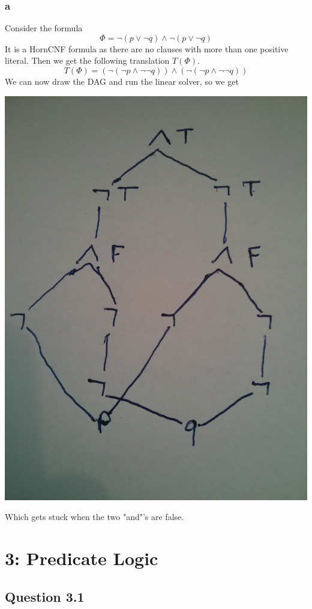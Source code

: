 \documentclass[12pt]{article}
\begin{document}
\subsubsection*{a}
Consider the formula 
$$\Phi=\neg(p\lor\neg q)\land\neg(p\lor\neg q)$$
It is a HornCNF formula as there are no clauses with more than one positive literal. Then we get the following translation $T(\Phi)$.
$$T(\Phi)=(\neg(\neg p\land\neg\neg q))\land(\neg(\neg p\land \neg\neg q))$$
\newpage
We can now draw the DAG and run the linear solver, so we get
\begin{center}
\includegraphics[scale=0.1]{3}
\end{center}
Which gets stuck when the two "and"'s are false.

\section*{3: Predicate Logic}
\subsection*{Question 3.1}
\end{document}
